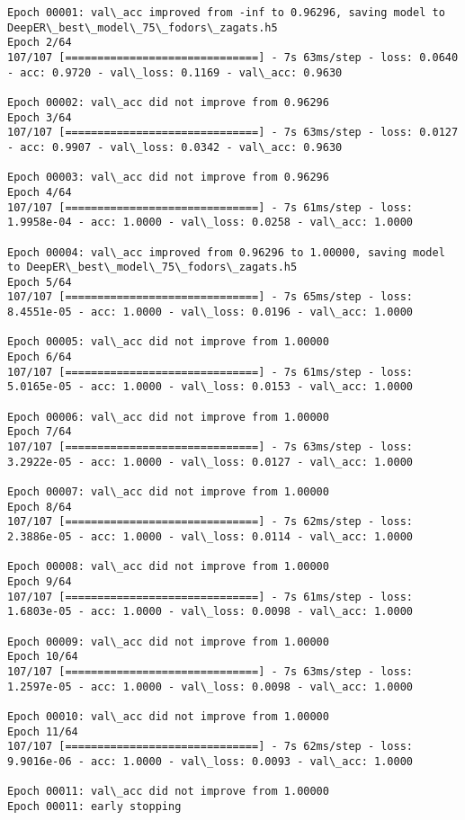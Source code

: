 \documentclass[11pt]{article}
\begin{document}
\begin{Verbatim}[commandchars=\\\{\}]
Epoch 00001: val\_acc improved from -inf to 0.96296, saving model to DeepER\_best\_model\_75\_fodors\_zagats.h5
Epoch 2/64
107/107 [==============================] - 7s 63ms/step - loss: 0.0640 - acc: 0.9720 - val\_loss: 0.1169 - val\_acc: 0.9630

Epoch 00002: val\_acc did not improve from 0.96296
Epoch 3/64
107/107 [==============================] - 7s 63ms/step - loss: 0.0127 - acc: 0.9907 - val\_loss: 0.0342 - val\_acc: 0.9630

Epoch 00003: val\_acc did not improve from 0.96296
Epoch 4/64
107/107 [==============================] - 7s 61ms/step - loss: 1.9958e-04 - acc: 1.0000 - val\_loss: 0.0258 - val\_acc: 1.0000

Epoch 00004: val\_acc improved from 0.96296 to 1.00000, saving model to DeepER\_best\_model\_75\_fodors\_zagats.h5
Epoch 5/64
107/107 [==============================] - 7s 65ms/step - loss: 8.4551e-05 - acc: 1.0000 - val\_loss: 0.0196 - val\_acc: 1.0000

Epoch 00005: val\_acc did not improve from 1.00000
Epoch 6/64
107/107 [==============================] - 7s 61ms/step - loss: 5.0165e-05 - acc: 1.0000 - val\_loss: 0.0153 - val\_acc: 1.0000

Epoch 00006: val\_acc did not improve from 1.00000
Epoch 7/64
107/107 [==============================] - 7s 63ms/step - loss: 3.2922e-05 - acc: 1.0000 - val\_loss: 0.0127 - val\_acc: 1.0000

Epoch 00007: val\_acc did not improve from 1.00000
Epoch 8/64
107/107 [==============================] - 7s 62ms/step - loss: 2.3886e-05 - acc: 1.0000 - val\_loss: 0.0114 - val\_acc: 1.0000

Epoch 00008: val\_acc did not improve from 1.00000
Epoch 9/64
107/107 [==============================] - 7s 61ms/step - loss: 1.6803e-05 - acc: 1.0000 - val\_loss: 0.0098 - val\_acc: 1.0000

Epoch 00009: val\_acc did not improve from 1.00000
Epoch 10/64
107/107 [==============================] - 7s 63ms/step - loss: 1.2597e-05 - acc: 1.0000 - val\_loss: 0.0098 - val\_acc: 1.0000

Epoch 00010: val\_acc did not improve from 1.00000
Epoch 11/64
107/107 [==============================] - 7s 62ms/step - loss: 9.9016e-06 - acc: 1.0000 - val\_loss: 0.0093 - val\_acc: 1.0000

Epoch 00011: val\_acc did not improve from 1.00000
Epoch 00011: early stopping


\end{Verbatim}
\end{document}
